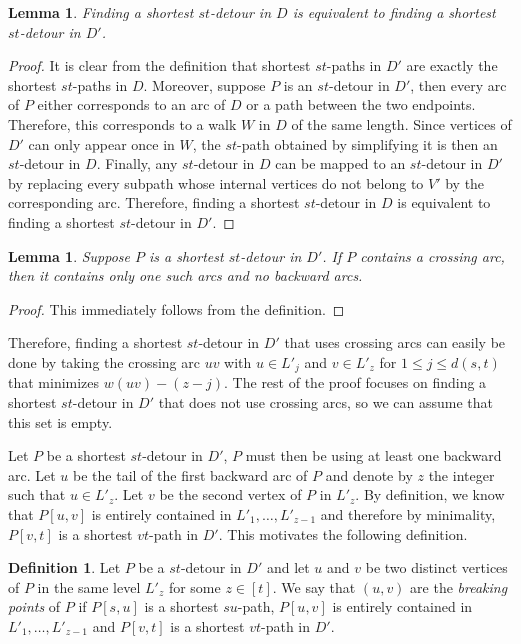 \documentclass[utf8,11pt]{article}
\theoremstyle{plain}
\newtheorem{lemma}[theorem]{Lemma}
\theoremstyle{definition}
\newtheorem{definition}[theorem]{Definition}
\begin{document}
\begin{lemma}
    Finding a shortest $st$-detour in $D$ is equivalent to finding a shortest $st$-detour in $D'$.
\end{lemma}

\begin{proof}
It is clear from the definition that shortest $st$-paths in $D'$ are exactly the shortest $st$-paths in $D$. Moreover, suppose $P$ is an $st$-detour in $D'$, then every arc of $P$ either corresponds to an arc of $D$ or a path between the two endpoints. Therefore, this corresponds to a walk $W$ in $D$ of the same length. Since vertices of $D'$ can only appear once in $W$, the $st$-path obtained by simplifying it is then an $st$-detour in $D$. Finally, any $st$-detour in $D$ can be mapped to an $st$-detour in $D'$ by replacing every subpath whose internal vertices do not belong to $V'$ by the corresponding arc. Therefore, finding a shortest $st$-detour in $D$ is equivalent to finding a shortest $st$-detour in $D'$. 
\end{proof}


\begin{lemma}
    Suppose $P$ is a shortest $st$-detour in $D'$. If $P$ contains a crossing arc, then it contains only one such arcs and no backward arcs.
\end{lemma}

\begin{proof}
    This immediately follows from the definition.
\end{proof}

Therefore, finding a shortest $st$-detour in $D'$ that uses crossing arcs can easily be done by taking the crossing arc $uv$ with $u \in L'_{j}$ and $v \in L'_{z}$ for $1 \leq j \leq d(s,t)$ that minimizes $w(uv) - (z-j)$. The rest of the proof focuses on finding a shortest $st$-detour in $D'$ that does not use crossing arcs, so we can assume that this set is empty.

Let $P$ be a shortest $st$-detour in $D'$, $P$ must then be using at least one backward arc. Let $u$ be the tail of the first backward arc of $P$ and denote by $z$ the integer such that $u \in L'_z$. Let $v$ be the second vertex of $P$ in $L'_z$. By definition, we know that $P[u,v]$ is entirely contained in $L'_1, \dots, L'_{z-1}$ and therefore by minimality, $P[v,t]$ is a shortest $vt$-path in $D'$. This motivates the following definition.

\begin{definition}
    Let $P$ be a $st$-detour in $D'$ and let $u$ and $v$ be two distinct vertices of $P$ in the same level $L'_z$ for some $z \in [t]$. We say that $(u,v)$ are the \textit{breaking points} of $P$ if $P[s,u]$ is a shortest $su$-path, $P[u,v]$ is entirely contained in $L'_1, \dots, L'_{z-1}$ and $P[v,t]$ is a shortest $vt$-path in $D'$.
\end{definition}
\end{document}
